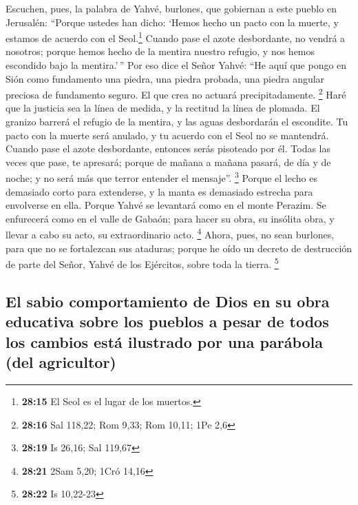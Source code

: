 \begin{paracol}{2}
 Escuchen, pues, la palabra de Yahvé, burlones, que
gobiernan a este pueblo en Jerusalén:  ``Porque ustedes
han dicho: `Hemos hecho un pacto con la muerte, y estamos de acuerdo con
el Seol.\footnote{\textbf{28:15} El Seol es el lugar de los muertos.}
Cuando pase el azote desbordante, no vendrá a nosotros; porque hemos
hecho de la mentira nuestro refugio, y nos hemos escondido bajo la
mentira.'\,''  Por eso dice el Señor Yahvé: ``He aquí que
pongo en Sión como fundamento una piedra, una piedra probada, una piedra
angular preciosa de fundamento seguro. El que crea no actuará
precipitadamente. \footnote{\textbf{28:16} Sal 118,22; Rom 9,33; Rom
  10,11; 1Pe 2,6}  Haré que la justicia sea la línea de
medida, y la rectitud la línea de plomada. El granizo barrerá el refugio
de la mentira, y las aguas desbordarán el escondite.  Tu
pacto con la muerte será anulado, y tu acuerdo con el Seol no se
mantendrá. Cuando pase el azote desbordante, entonces serás pisoteado
por él.  Todas las veces que pase, te apresará; porque de
mañana a mañana pasará, de día y de noche; y no será más que terror
entender el mensaje''. \footnote{\textbf{28:19} Is 26,16; Sal 119,67}
 Porque el lecho es demasiado corto para extenderse, y la
manta es demasiado estrecha para envolverse en ella. 
Porque Yahvé se levantará como en el monte Perazim. Se enfurecerá como
en el valle de Gabaón; para hacer su obra, su insólita obra, y llevar a
cabo su acto, su extraordinario acto. \footnote{\textbf{28:21} 2Sam
  5,20; 1Cró 14,16}  Ahora, pues, no sean burlones, para
que no se fortalezcan sus ataduras; porque he oído un decreto de
destrucción de parte del Señor, Yahvé de los Ejércitos, sobre toda la
tierra. \footnote{\textbf{28:22} Is 10,22-23}

\hypertarget{el-sabio-comportamiento-de-dios-en-su-obra-educativa-sobre-los-pueblos-a-pesar-de-todos-los-cambios-estuxe1-ilustrado-por-una-paruxe1bola-del-agricultor}{%
\subsection{El sabio comportamiento de Dios en su obra educativa sobre
los pueblos a pesar de todos los cambios está ilustrado por una parábola
(del
agricultor)}\label{el-sabio-comportamiento-de-dios-en-su-obra-educativa-sobre-los-pueblos-a-pesar-de-todos-los-cambios-estuxe1-ilustrado-por-una-paruxe1bola-del-agricultor}}


\end{paracol}
